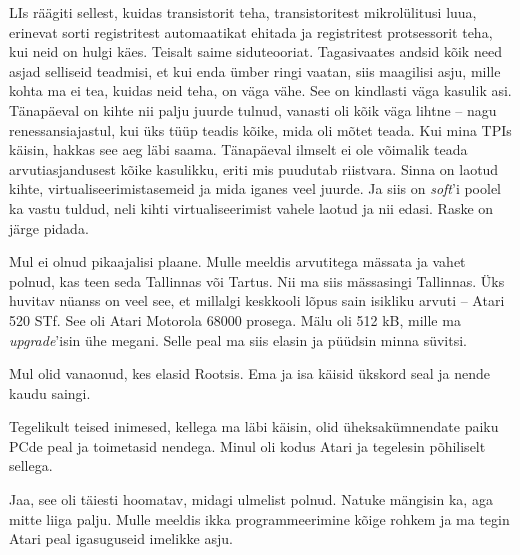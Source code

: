 
LIs räägiti sellest, 
kuidas transistorit teha, transistoritest 
mikrolülitusi luua, erinevat sorti 
registritest automaatikat ehitada ja registritest protsessorit teha, kui neid on 
hulgi käes. Teisalt saime siduteooriat. Tagasivaates andsid kõik need asjad selliseid teadmisi, et kui 
enda ümber ringi vaatan, siis maagilisi asju, mille kohta ma ei tea, 
kuidas neid teha, on väga vähe. See on kindlasti väga kasulik asi. Tänapäeval on kihte nii 
palju juurde tulnud, vanasti oli kõik väga lihtne -- nagu 
renessansiajastul, kui üks tüüp teadis kõike, mida oli mõtet teada. 
Kui mina TPIs käisin, hakkas see aeg läbi saama. Tänapäeval ilmselt ei ole võimalik teada arvutiasjandusest kõike 
kasulikku, eriti mis puudutab riistvara. Sinna on laotud kihte, virtualiseerimistasemeid ja mida iganes veel juurde. Ja siis on \emph{soft}'i poolel ka vastu 
tuldud, neli kihti virtualiseerimist vahele laotud ja nii edasi. Raske on järge pidada.


Mul ei olnud pikaajalisi plaane. Mulle meeldis arvutitega mässata ja vahet polnud, kas teen seda Tallinnas või 
Tartus. Nii ma siis mässasingi Tallinnas. Üks huvitav nüanss 
on veel see, et millalgi keskkooli lõpus sain isikliku arvuti -- Atari 520 STf. See
oli Atari Motorola 68000 prosega. Mälu oli 512 kB, mille ma 
\emph{upgrade}'isin ühe megani. Selle peal ma siis elasin ja püüdsin minna süvitsi. 


Mul olid vanaonud, kes elasid Rootsis. Ema ja isa käisid ükskord seal ja nende
kaudu saingi. 


Tegelikult teised inimesed, kellega ma läbi käisin, olid üheksakümnendate paiku PCde peal ja 
toimetasid nendega. Minul oli kodus Atari ja tegelesin 
põhiliselt sellega. 


Jaa, see oli täiesti hoomatav, midagi ulmelist 
polnud. Natuke mängisin ka, aga mitte liiga palju. Mulle meeldis ikka 
programmeerimine kõige rohkem ja ma tegin Atari peal igasuguseid imelikke asju.

